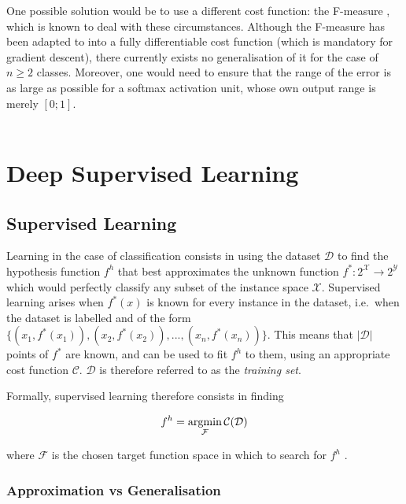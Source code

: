 \documentclass[a4paper,11pt]{article}
\begin{document}
One possible solution would be to use a different cost function: the F-measure \cite{f-measure}, which is known to deal with these circumstances. Although the F-measure has been adapted to into a fully differentiable cost function (which is mandatory for gradient descent), there currently exists no generalisation of it for the case of $n \ge 2$
classes. Moreover, one would need to ensure that the range of the error is as large as possible for a softmax activation unit, whose own output range is merely $[0;1]$. \\ \\


\clearpage


\section{Deep Supervised Learning}

\subsection{Supervised Learning}

Learning in the case of classification consists in using the dataset $\mathcal{D}$ to find the hypothesis function $f^{h}$ that best approximates the unknown function $f^{*} : 2^{\mathcal{X}} \rightarrow 2^{\mathcal{Y}}$ which would perfectly classify any subset of the instance space $\mathcal{X}$. Supervised learning arises when $f^{*}(x)$ is known for every instance in the dataset, i.e.\ when the dataset is labelled and of the form $\{(x_{1},f^{*}(x_{1})),(x_{2},f^{*}(x_{2})), ..., (x_{n},f^{*}(x_{n}))\}$. This means that $|\mathcal{D}|$ points of $f^{*}$ are known, and can be used to fit $f^{h}$ to them, using an appropriate cost function $\mathcal{C}$. $\mathcal{D}$ is therefore referred to as the \textit{training set}. 

Formally, supervised learning therefore consists in finding

\begin{equation}
\label{learning: optimisation equation}
  f^{h} = \operatornamewithlimits{argmin}\limits_{\mathcal{F}}\operatorname{\mathcal{C}}(\mathcal{D})
\end{equation}
  
where $\mathcal{F}$ is the chosen target function space in which to search for $f^{h}$ . \\

\subsubsection{Approximation vs Generalisation}
\end{document}
